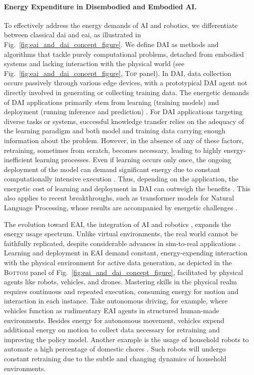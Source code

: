 \documentclass[12pt]{article}
\begin{document}
\paragraph*{Energy Expenditure in Disembodied and Embodied AI.}
To effectively address the energy demands of AI and robotics, we differentiate between classical \ac{dai} and \ac{eai}, as illustrated in Fig.~\ref{fig:eai_and_dai_concept_figure}. We define DAI as methods and algorithms that tackle purely computational problems, detached from embodied systems and lacking interaction with the physical world (see Fig.~\ref{fig:eai_and_dai_concept_figure}, \textsc{Top} panel). In DAI, data collection occurs passively through various edge devices, with a prototypical DAI agent not directly involved in generating or collecting training data. The energetic demands of DAI applications primarily stem from learning (training models) and deployment (running inference and prediction) \cite{Vries2023growingenergyfootprint}. For DAI applications targeting diverse tasks or systems, successful knowledge transfer relies on the adequacy of the learning paradigm and both model and training data carrying enough information about the problem. However, in the absence of any of these factors, retraining, sometimes from scratch, becomes necessary, leading to highly energy-inefficient learning processes. Even if learning occurs only once, the ongoing deployment of the model can demand significant energy due to constant computationally intensive execution \cite{Vries2023growingenergyfootprint}. Thus, depending on the application, the energetic cost of learning and deployment in DAI can outweigh the benefits \cite{Strubell2019EnergyPolicyConsiderations}. This also applies to recent breakthroughs, such as transformer models for Natural Language Processing, whose results are accompanied by energetic challenges \cite{Cao2020TowardsAccurateReliable}.

The evolution toward EAI, the integration of AI and robotics \cite{Pfeifer2004Embodiedartificialintelligence}, expands the energy usage spectrum. Unlike virtual environments, the real world cannot be faithfully replicated, despite considerable advances in sim-to-real applications \cite{Chebotar2019Closingsimreal}. Learning and deployment in EAI demand constant, energy-expending interaction with the physical environment for active data generation, as depicted in the \textsc{Bottom} panel of Fig.~\ref{fig:eai_and_dai_concept_figure}, facilitated by physical agents like robots, vehicles, and drones. Mastering skills in the physical realm requires continuous and repeated execution, consuming energy for motion and interaction in each instance. Take autonomous driving, for example, where vehicles function as rudimentary EAI agents in structured human-made environments. Besides energy for autonomous movement, vehicles expend additional energy on motion to collect data necessary for retraining and improving the policy model. Another example is the usage of household robots to automate a high percentage of domestic chores \cite{Lehdonvirta2022futuresunpaidwork}. Such robots will undergo constant retraining due to the subtle and changing dynamics of household environments.
\end{document}

